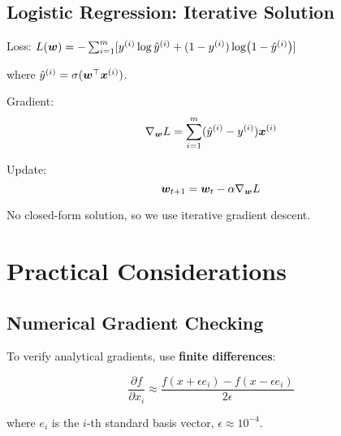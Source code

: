 \subsection{Logistic Regression: Iterative Solution}

\begin{example}
Loss: $L(\bm{w}) = -\sum_{i=1}^m [y^{(i)} \log \hat{y}^{(i)} + (1-y^{(i)}) \log(1-\hat{y}^{(i)})]$

where $\hat{y}^{(i)} = \sigma(\bm{w}^\top \bm{x}^{(i)})$.

Gradient:
\begin{equation}
    \nabla_{\bm{w}} L = \sum_{i=1}^m (\hat{y}^{(i)} - y^{(i)}) \bm{x}^{(i)}
\end{equation}

Update:
\begin{equation}
    \bm{w}_{t+1} = \bm{w}_t - \alpha \nabla_{\bm{w}} L
\end{equation}

No closed-form solution, so we use iterative gradient descent.
\end{example}

\section{Practical Considerations}

\subsection{Numerical Gradient Checking}

To verify analytical gradients, use \textbf{finite differences}:

\begin{equation}
    \frac{\partial f}{\partial x_i} \approx \frac{f(x + \epsilon e_i) - f(x - \epsilon e_i)}{2\epsilon}
\end{equation}

where $e_i$ is the $i$-th standard basis vector, $\epsilon \approx 10^{-4}$.

